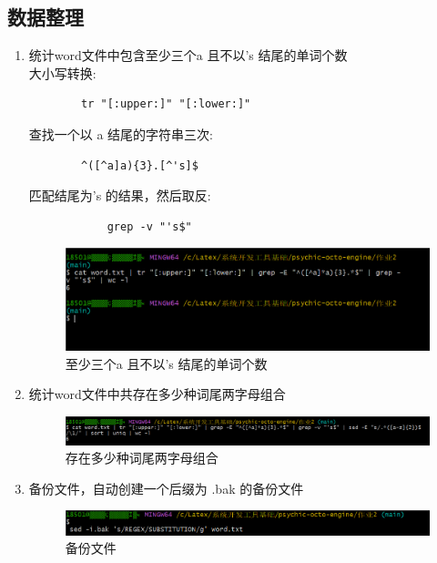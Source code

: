 \documentclass{ctexart}
\begin{document}
\subsection{数据整理}
\begin{enumerate}
    \item  统计word文件中包含至少三个a 且不以's 结尾的单词个数\\
    大小写转换:
    \begin{lstlisting}
        tr "[:upper:]" "[:lower:]" 
        \end{lstlisting}
    查找一个以 a 结尾的字符串三次:
    \begin{lstlisting}
        ^([^a]a){3}.[^'s]$
        \end{lstlisting}
    匹配结尾为’s 的结果，然后取反:
        \begin{lstlisting}
            grep -v "'s$"
            \end{lstlisting}
    \begin{figure}[H]
       \centering
       \includegraphics[width=14cm]{b5330fb548798ea1133829ff684385ea.png}
       \caption{至少三个a 且不以's 结尾的单词个数}
       \label{fig:3}
   \end{figure}
   \item  统计word文件中共存在多少种词尾两字母组合\\
   \begin{figure}[H]
    \centering
    \includegraphics[width=14cm]{609a841f96213fe23a92fb328338af93.png}
    \caption{存在多少种词尾两字母组合}
    \label{fig:3}
\end{figure}
    \item  备份文件，自动创建一个后缀为 .bak 的备份文件\\
    \begin{figure}[H]
     \centering
     \includegraphics[width=14cm]{b342240e131500e7d40bf6cda43255e9.png}
     \caption{备份文件}
     \label{fig:3}

\end{figure}

\end{enumerate}
\end{document}
